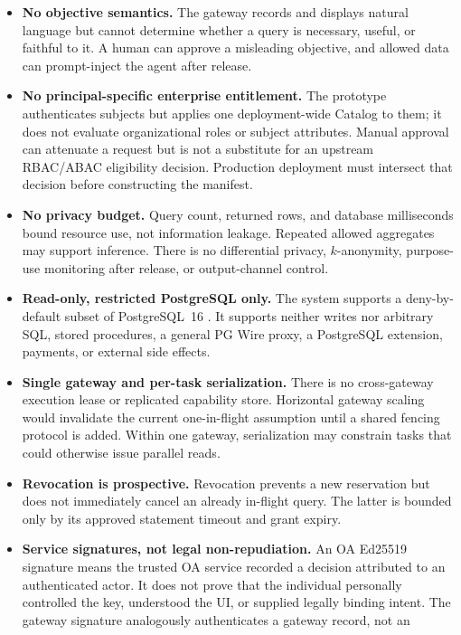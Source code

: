 \documentclass[10pt,journal,compsoc]{IEEEtran}
\newcommand{\code}[1]{\texttt{\detokenize{#1}}}
\begin{document}
\begin{itemize}
  \item \textbf{No objective semantics.}  The gateway records and displays
  natural language but cannot determine whether a query is necessary, useful,
  or faithful to it.  A human can approve a misleading objective, and allowed
  data can prompt-inject the agent after release.
  \item \textbf{No principal-specific enterprise entitlement.}  The prototype
  authenticates subjects but applies one deployment-wide Catalog to them; it
  does not evaluate organizational roles or subject attributes.  Manual approval
  can attenuate a request but is not a substitute for an upstream RBAC/ABAC
  eligibility decision.  Production deployment must intersect that decision
  before constructing the manifest.
  \item \textbf{No privacy budget.}  Query count, returned rows, and database
  milliseconds bound resource use, not information leakage.  Repeated allowed
  aggregates may support inference.  There is no differential privacy,
  $k$-anonymity, purpose-use monitoring after release, or output-channel control.
  \item \textbf{Read-only, restricted PostgreSQL only.}  The system supports a
  deny-by-default subset of PostgreSQL~16 \code{SELECT}.  It supports neither
  writes nor arbitrary SQL, stored procedures, a general PG Wire proxy, a
  PostgreSQL extension, payments, or external side effects.
  \item \textbf{Single gateway and per-task serialization.}  There is no
  cross-gateway execution lease or replicated capability store.  Horizontal
  gateway scaling would invalidate the current one-in-flight assumption until a
  shared fencing protocol is added.  Within one gateway, serialization may
  constrain tasks that could otherwise issue parallel reads.
  \item \textbf{Revocation is prospective.}  Revocation prevents a new
  reservation but does not immediately cancel an already in-flight query.  The
  latter is bounded only by its approved statement timeout and grant expiry.
  \item \textbf{Service signatures, not legal non-repudiation.}  An OA
  Ed25519 signature means the trusted OA service recorded a decision attributed
  to an authenticated actor.  It does not prove that the individual personally
  controlled the key, understood the UI, or supplied legally binding intent.
  The gateway signature analogously authenticates a gateway record, not an

\end{itemize}
\end{document}
